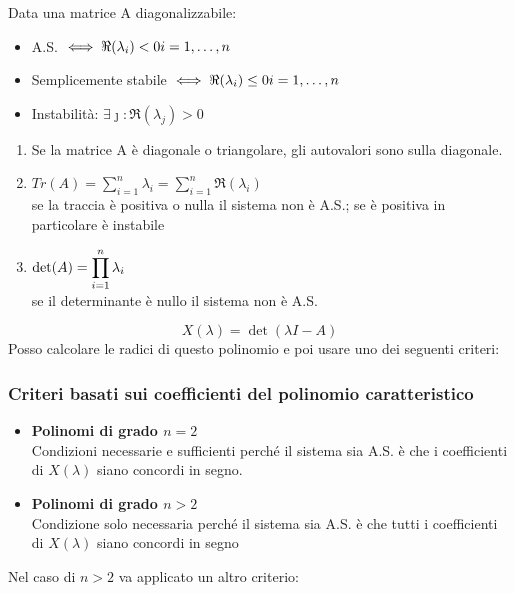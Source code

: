 	Data una matrice A diagonalizzabile:\\
	\begin{itemize}
		\item A.S. $\iff \Re(\lambda_i)<0 \space i = 1,\dots,n$
		\item Semplicemente stabile $\iff \Re(\lambda_i)\leq 0 \space i=1,\dots,n$
		\item Instabilità: $\exists \jmath : \Re(\lambda_j)>0$
	\end{itemize}
	\begin{enumerate}
		\item Se la matrice A è diagonale o triangolare, gli autovalori sono sulla diagonale.
		\item $ Tr(A) = \sum_{i =1}^{n} \lambda_i =\sum_{i=1}^{n}\Re(\lambda_i)$\\
		se la traccia è positiva o nulla il sistema non è A.S.; se è positiva in particolare è instabile
		\item $\det(A) =\displaystyle\prod_{i=1}^{n}\lambda_i$\\
		se il determinante è nullo il sistema non è A.S.
	\end{enumerate}
	\[\boxed{X(\lambda) =\det(\lambda I-A)}\]
	Posso calcolare le radici di questo polinomio e poi usare uno dei seguenti criteri:
	\subsubsection{Criteri basati sui coefficienti del polinomio caratteristico}
	\begin{itemize}
		\item \textbf{Polinomi di grado $ n=2 $}\\
		Condizioni necessarie e sufficienti perché il sistema sia A.S. è che i coefficienti di $ X(\lambda) $ siano concordi in segno.
		\item \textbf{Polinomi di grado $ n>2 $}\\
		Condizione solo necessaria perché il sistema sia A.S. è che tutti i coefficienti di $ X(\lambda) $ siano concordi in segno
	\end{itemize}
	Nel caso di $ n>2 $ va applicato un altro criterio:
